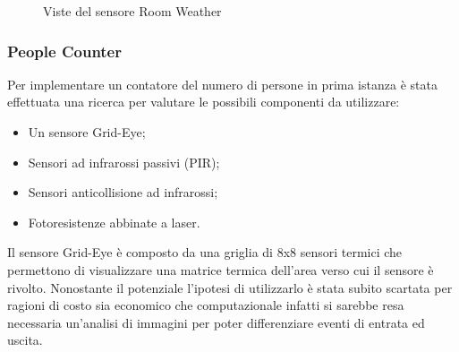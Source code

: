 \documentclass{article}
\begin{document}
\bigskip

\begin{figure}%
    \centering
    \qquad
    \caption{Viste del sensore Room Weather}
    \label{fig:viewRW}%
\end{figure}

\subsubsection{People Counter}

Per implementare un contatore del numero di persone in prima istanza è stata effettuata una ricerca per valutare le possibili componenti da utilizzare: 

\begin{itemize}
    \item Un sensore Grid-Eye;
    \item Sensori ad infrarossi passivi (PIR);
    \item Sensori anticollisione ad infrarossi; 
    \item Fotoresistenze abbinate a laser.
\end{itemize}

Il sensore Grid-Eye è composto da una griglia di 8x8 sensori termici che permettono di visualizzare una matrice termica dell'area verso cui il sensore è rivolto. Nonostante il potenziale l'ipotesi di utilizzarlo è stata subito scartata per ragioni di costo sia economico che computazionale infatti si sarebbe resa necessaria un'analisi di immagini per poter differenziare eventi di entrata ed uscita.
\end{document}
